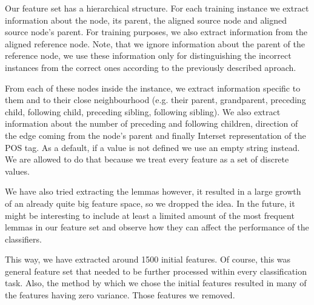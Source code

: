 Our feature set has a hierarchical structure. For each training instance we extract
information about the node, its parent, the aligned source node and aligned source node's
parent. For training purposes, we also extract information from the aligned reference
node. Note, that we ignore information about the parent of the reference node, we
use these information only for distinguishing the incorrect instances from the correct ones
according to the previously described aproach.

From each of these  nodes inside the instance, we extract information
specific to them and to their close neighbourhood (e.g. their parent, grandparent,
preceding child, following child, preceding sibling, following sibling). We
also extract information about the number of preceding and following children,
direction of the edge coming from the node's parent and finally Interset representation
of the POS tag. As a default, if a value is not defined we use an empty string instead.
We are allowed to do that because we treat every feature as a set of discrete values.

We have also tried extracting the lemmas however, it resulted in a
large growth of an already quite big feature space, so we dropped the idea.
In the future, it might be interesting to include at least a limited amount of the most frequent lemmas in our
feature set and observe how they can affect the performance of the classifiers.

This way, we have extracted around 1500 initial features. Of course, this was general feature
set that needed to be further processed within every classification task. Also, the method
by which we chose the initial features resulted in many of the features having zero
variance. Those features we removed.


